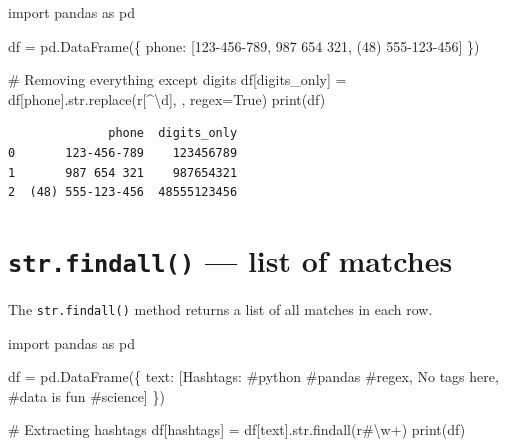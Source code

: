 \documentclass[
  english,
  letterpaper,
  DIV=11,
  numbers=noendperiod]{scrreprt}
\newenvironment{Shaded}{\begin{snugshade}}{\end{snugshade}}
\newcommand{\BuiltInTok}[1]{\textcolor[rgb]{0.00,0.23,0.31}{#1}}
\newcommand{\CommentTok}[1]{\textcolor[rgb]{0.37,0.37,0.37}{#1}}
\newcommand{\DecValTok}[1]{\textcolor[rgb]{0.68,0.00,0.00}{#1}}
\newcommand{\ImportTok}[1]{\textcolor[rgb]{0.00,0.46,0.62}{#1}}
\newcommand{\NormalTok}[1]{\textcolor[rgb]{0.00,0.23,0.31}{#1}}
\newcommand{\OperatorTok}[1]{\textcolor[rgb]{0.37,0.37,0.37}{#1}}
\newcommand{\PreprocessorTok}[1]{\textcolor[rgb]{0.68,0.00,0.00}{#1}}
\newcommand{\StringTok}[1]{\textcolor[rgb]{0.13,0.47,0.30}{#1}}
\newcommand{\VariableTok}[1]{\textcolor[rgb]{0.07,0.07,0.07}{#1}}
\newcommand{\VerbatimStringTok}[1]{\textcolor[rgb]{0.13,0.47,0.30}{#1}}
\begin{document}
\begin{Shaded}
\begin{Highlighting}[]
\ImportTok{import}\NormalTok{ pandas }\ImportTok{as}\NormalTok{ pd}

\NormalTok{df }\OperatorTok{=}\NormalTok{ pd.DataFrame(\{}
    \StringTok{\textquotesingle{}phone\textquotesingle{}}\NormalTok{: [}\StringTok{\textquotesingle{}123{-}456{-}789\textquotesingle{}}\NormalTok{, }\StringTok{\textquotesingle{}987 654 321\textquotesingle{}}\NormalTok{, }\StringTok{\textquotesingle{}(48) 555{-}123{-}456\textquotesingle{}}\NormalTok{]}
\NormalTok{\})}

\CommentTok{\# Removing everything except digits}
\NormalTok{df[}\StringTok{\textquotesingle{}digits\_only\textquotesingle{}}\NormalTok{] }\OperatorTok{=}\NormalTok{ df[}\StringTok{\textquotesingle{}phone\textquotesingle{}}\NormalTok{].}\BuiltInTok{str}\NormalTok{.replace(}\VerbatimStringTok{r\textquotesingle{}}\PreprocessorTok{[\^{}}\DecValTok{\textbackslash{}d}\PreprocessorTok{]}\VerbatimStringTok{\textquotesingle{}}\NormalTok{, }\StringTok{\textquotesingle{}\textquotesingle{}}\NormalTok{, regex}\OperatorTok{=}\VariableTok{True}\NormalTok{)}
\BuiltInTok{print}\NormalTok{(df)}
\end{Highlighting}
\end{Shaded}

\begin{verbatim}
              phone  digits_only
0       123-456-789    123456789
1       987 654 321    987654321
2  (48) 555-123-456  48555123456
\end{verbatim}

\section{\texorpdfstring{\texttt{str.findall()} --- list of
matches}{str.findall() --- list of matches}}\label{str.findall-list-of-matches}

The \texttt{str.findall()} method returns a list of all matches in each
row.

\begin{Shaded}
\begin{Highlighting}[]
\ImportTok{import}\NormalTok{ pandas }\ImportTok{as}\NormalTok{ pd}

\NormalTok{df }\OperatorTok{=}\NormalTok{ pd.DataFrame(\{}
    \StringTok{\textquotesingle{}text\textquotesingle{}}\NormalTok{: [}\StringTok{\textquotesingle{}Hashtags: \#python \#pandas \#regex\textquotesingle{}}\NormalTok{, }\StringTok{\textquotesingle{}No tags here\textquotesingle{}}\NormalTok{, }\StringTok{\textquotesingle{}\#data is fun \#science\textquotesingle{}}\NormalTok{]}
\NormalTok{\})}

\CommentTok{\# Extracting hashtags}
\NormalTok{df[}\StringTok{\textquotesingle{}hashtags\textquotesingle{}}\NormalTok{] }\OperatorTok{=}\NormalTok{ df[}\StringTok{\textquotesingle{}text\textquotesingle{}}\NormalTok{].}\BuiltInTok{str}\NormalTok{.findall(}\VerbatimStringTok{r\textquotesingle{}\#}\DecValTok{\textbackslash{}w}\OperatorTok{+}\VerbatimStringTok{\textquotesingle{}}\NormalTok{)}
\BuiltInTok{print}\NormalTok{(df)}
\end{Highlighting}
\end{Shaded}
\end{document}

